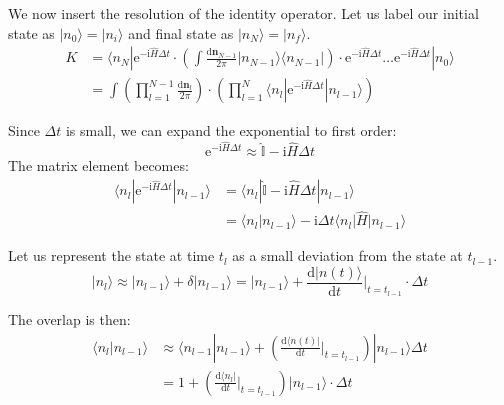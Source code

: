 We now insert the resolution of the identity operator. Let us label our
initial state as $|n_0\rangle=|n_i\rangle$ and final state as $|n_N\rangle=|n_f\rangle$.
\begin{equation}
\begin{aligned}
K &= \langle n_N | \mathrm{e}^{-\mathrm{i}\hat{H}\Delta t} \cdot \left( \int \frac{\mathrm{d}\bm{n}_{N-1}}{2\pi} |n_{N-1}\rangle\langle n_{N-1}| \right) \cdot \mathrm{e}^{-\mathrm{i}\hat{H}\Delta t} \dots \mathrm{e}^{-\mathrm{i}\hat{H}\Delta t} |n_0\rangle \\
&= \int \left( \prod_{l=1}^{N-1} \frac{\mathrm{d}\bm{n}_l}{2\pi} \right) \cdot \left( \prod_{l=1}^N \langle n_l | \mathrm{e}^{-\mathrm{i}\hat{H}\Delta t} | n_{l-1}\rangle \right)
\end{aligned}
\end{equation}

Since $\Delta t$ is small, we can expand the exponential to first order:
\begin{equation}
\mathrm{e}^{-\mathrm{i}\hat{H}\Delta t} \approx \hat{\mathbb{I}} - \mathrm{i}\hat{H}\Delta t
\end{equation}
The matrix element becomes:
\begin{equation}
\begin{aligned}
\langle n_l | \mathrm{e}^{-\mathrm{i}\hat{H}\Delta t} | n_{l-1}\rangle &= \langle n_l | \hat{\mathbb{I}} - \mathrm{i}\hat{H}\Delta t | n_{l-1}\rangle \\
&= \langle n_l | n_{l-1}\rangle - \mathrm{i} \Delta t \langle n_l | \hat{H} | n_{l-1}\rangle
\end{aligned}
\end{equation}

Let us represent the state at time $t_l$ as a small deviation
from the state at $t_{l-1}$.
\begin{equation}
|n_l\rangle \approx |n_{l-1}\rangle + \delta|n_{l-1}\rangle = |n_{l-1}\rangle + \frac{\mathrm{d}|n(t)\rangle}{\mathrm{d}t}\Big|_{t=t_{l-1}} \cdot \Delta t
\end{equation}

The overlap is then:
\begin{equation}
\begin{aligned}
\langle n_l | n_{l-1}\rangle &\approx \langle n_{l-1} | n_{l-1}\rangle + \left( \frac{\mathrm{d}\langle n(t)|}{\mathrm{d}t}\Big|_{t=t_{l-1}} \right) |n_{l-1}\rangle \Delta t \\
&= 1 + \left( \frac{\mathrm{d}\langle n_l|}{\mathrm{d}t}\Big|_{t=t_{l-1}} \right) |n_{l-1}\rangle \cdot \Delta t
\end{aligned}
\end{equation}

